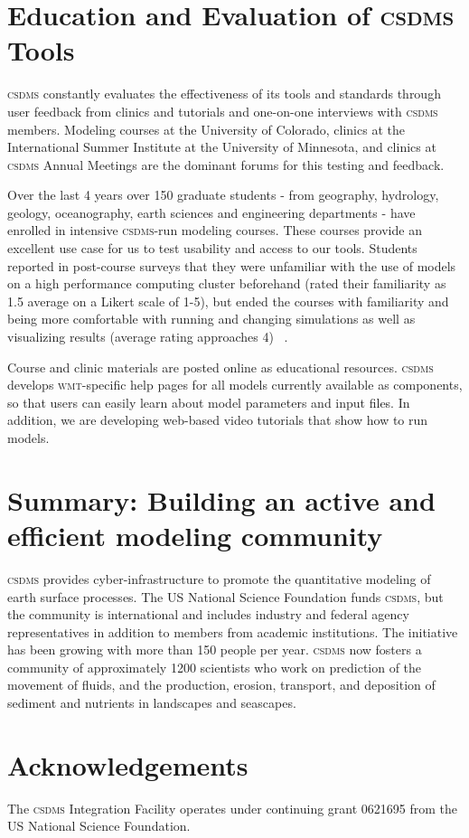 \documentclass[11pt, oneside]{amsart}
\DeclareRobustCommand{\csdms}{\textsc{csdms}}
\DeclareRobustCommand{\wmt}{\textsc{wmt}}
\begin{document}
\section{Education and Evaluation of \csdms{} Tools}
\label{sec:education}


\csdms{} constantly evaluates the effectiveness of its tools and standards
through user feedback from clinics and tutorials and one-on-one interviews
with \csdms{} members.  Modeling courses at the University of Colorado,
clinics at the International Summer Institute at the University of Minnesota,
and clinics at \csdms{} Annual Meetings are the dominant forums for
this testing and feedback. 

Over the last 4 years over 150 graduate students - from geography, hydrology,
geology, oceanography, earth sciences and engineering departments - have
enrolled in intensive \csdms{}-run modeling courses. These courses
provide an excellent use case for us to test usability and access to our
tools. Students reported in post-course surveys that they were unfamiliar with
the use of models on a high performance computing cluster beforehand (rated
their familiarity as 1.5 average on a Likert scale of 1-5), but ended the
courses with familiarity and being more comfortable with running and changing
simulations as well as visualizing results (average rating approaches 4)
~\cite{overeem2013strategies}. 

Course and clinic materials are posted online as educational resources.
\csdms{} develops \wmt{}-specific help pages for all models currently
available as components, so that users can easily learn about model
parameters and input files. In addition, we are developing web-based video
tutorials that show how to run models.

\section{Summary: Building an active and efficient modeling community}

\csdms{} provides cyber-infrastructure to promote the quantitative modeling of
earth surface processes. The US National Science Foundation funds \csdms{}, but
the community is international and includes industry and federal agency
representatives in addition to members from academic institutions. The
initiative has been growing with more than 150 people per year. \csdms{} now
fosters a community of approximately 1200 scientists who work on prediction
of the movement of fluids, and the production, erosion, transport, and
deposition of sediment and nutrients in landscapes and seascapes. 

\section{Acknowledgements}

The \csdms{} Integration Facility operates under continuing grant 0621695
from the US National Science Foundation.



{}
\end{document}
